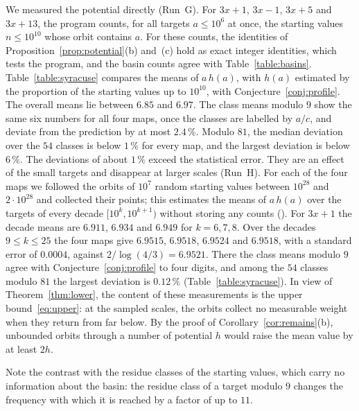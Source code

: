 \documentclass[12pt]{amsart}
\theoremstyle{definition}
\theoremstyle{remark}
\begin{document}
We measured the potential directly (Run~G). For $3x+1$, $3x-1$, $3x+5$ and $3x+13$, the program  counts, for all targets $a\le10^6$ at once, the starting values $n\le10^{10}$ whose orbit contains $a$. For these counts, the identities of Proposition~\ref{prop:potential}(b) and~(c) hold as exact integer identities, which tests the program, and the basin counts agree with Table~\ref{table:basins}. Table~\ref{table:syracuse} compares the means of $a\,h(a)$, with $h(a)$ estimated by the proportion of the starting values up to $10^{10}$, with Conjecture~\ref{conj:profile}. The overall means lie between $6.85$ and $6.97$. The class means modulo $9$ show the same six numbers for all four maps, once the classes are labelled by $a/c$, and deviate from the prediction by at most $2.4\,\%$. Modulo $81$, the median deviation over the $54$ classes is below $1\,\%$ for every map, and the largest deviation is below $6\,\%$. The deviations of about $1\,\%$ exceed the statistical error. They are an effect of the small targets and disappear at larger scales (Run~H). For each of the four maps we followed the orbits of $10^7$ random starting values between $10^{28}$ and $2\cdot10^{28}$ and collected their points; this estimates the means of $a\,h(a)$ over the targets of every decade $[10^k,10^{k+1})$ without storing any counts (). For $3x+1$ the decade means are $6.911$, $6.934$ and $6.949$ for $k=6,7,8$. Over the decades $9\le k\le25$ the four maps give $6.9515$, $6.9518$, $6.9524$ and $6.9518$, with a standard error of $0.0004$, against $2/\log(4/3)=6.9521$. There the class means modulo $9$ agree with Conjecture~\ref{conj:profile} to four digits, and among the $54$ classes modulo $81$ the largest deviation is $0.12\,\%$ (Table~\ref{table:syracuse}). In view of Theorem~\ref{thm:lower}, the content of these measurements is the upper bound~\eqref{eq:upper}: at the sampled scales, the orbits collect no measurable weight when they return from far below. By the proof of Corollary~\ref{cor:remains}(b), unbounded orbits through a number of potential $h$ would raise the mean value by at least $2h$.

Note the contrast with the residue classes of the starting values, which carry no information about the basin: the residue class of a target modulo $9$ changes the frequency with which it is reached by a factor of up to $11$.
\end{document}
